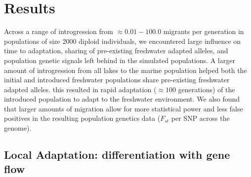 \documentclass{article}
\newcommand{\plr}[1]{\todo[linecolor=blue,backgroundcolor=blue!25,bordercolor=blue]{#1}}
\begin{document}



\section{Results}

Across a range of introgression from $\approx 0.01 - 100.0$ migrants per generation in populations of 
size 2000 diploid individuals, we encountered large influence on 
time to adaptation,
sharing of pre-existing freshwater adapted alleles,
and population genetic signals left behind in the simulated populations.
A larger amount of introgression from all lakes to the marine population helped both the initial and introduced freshwater populations 
share pre-existing freshwater adapted alleles.
this resulted in rapid adaptation ($\approx 100$ generations) of the introduced population to adapt to the freshwater environment.
We also found that larger amounts of migration allow for more statistical power and less false positives in the resulting population genetics data ($F_{st}$ per SNP across the genome).







\subsection*{Local Adaptation: differentiation with gene flow}

\end{document}
